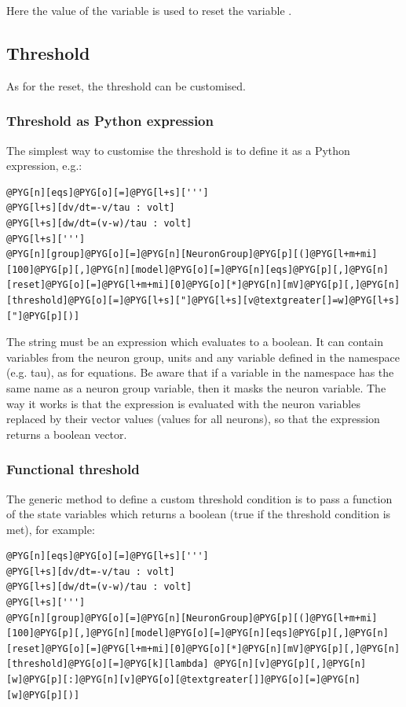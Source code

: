 \documentclass[letterpaper,10pt,english]{manual}
\begin{document}
Here the value of the variable  is used to reset the variable .


\subsection{Threshold}

As for the reset, the threshold can be customised.


\subsubsection{Threshold as Python expression}

The simplest way to customise the threshold is to define it as a Python expression, e.g.:

\begin{Verbatim}[commandchars=@\[\]]
@PYG[n][eqs]@PYG[o][=]@PYG[l+s][''']
@PYG[l+s][dv/dt=-v/tau : volt]
@PYG[l+s][dw/dt=(v-w)/tau : volt]
@PYG[l+s][''']
@PYG[n][group]@PYG[o][=]@PYG[n][NeuronGroup]@PYG[p][(]@PYG[l+m+mi][100]@PYG[p][,]@PYG[n][model]@PYG[o][=]@PYG[n][eqs]@PYG[p][,]@PYG[n][reset]@PYG[o][=]@PYG[l+m+mi][0]@PYG[o][*]@PYG[n][mV]@PYG[p][,]@PYG[n][threshold]@PYG[o][=]@PYG[l+s]["]@PYG[l+s][v@textgreater[]=w]@PYG[l+s]["]@PYG[p][)]
\end{Verbatim}

The string must be an expression which evaluates to a boolean. It can
contain variables from the neuron group, units and any variable defined in the namespace
(e.g. tau), as for equations. Be aware that if a variable in the namespace has the same
name as a neuron group variable, then it masks the neuron variable. The way it works is that
the expression is evaluated with the neuron variables replaced by their vector values (values for
all neurons), so that the expression returns a boolean vector.


\subsubsection{Functional threshold}

The generic method to define a custom threshold condition is to pass a function of the
state variables which returns a boolean (true if the threshold condition is met), for example:

\begin{Verbatim}[commandchars=@\[\]]
@PYG[n][eqs]@PYG[o][=]@PYG[l+s][''']
@PYG[l+s][dv/dt=-v/tau : volt]
@PYG[l+s][dw/dt=(v-w)/tau : volt]
@PYG[l+s][''']
@PYG[n][group]@PYG[o][=]@PYG[n][NeuronGroup]@PYG[p][(]@PYG[l+m+mi][100]@PYG[p][,]@PYG[n][model]@PYG[o][=]@PYG[n][eqs]@PYG[p][,]@PYG[n][reset]@PYG[o][=]@PYG[l+m+mi][0]@PYG[o][*]@PYG[n][mV]@PYG[p][,]@PYG[n][threshold]@PYG[o][=]@PYG[k][lambda] @PYG[n][v]@PYG[p][,]@PYG[n][w]@PYG[p][:]@PYG[n][v]@PYG[o][@textgreater[]]@PYG[o][=]@PYG[n][w]@PYG[p][)]
\end{Verbatim}
\end{document}
